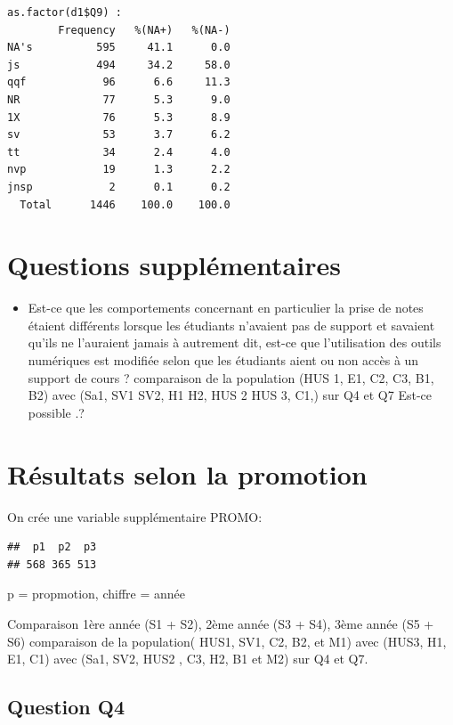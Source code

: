 \documentclass[]{article}
\begin{document}
\begin{verbatim}
as.factor(d1$Q9) : 
        Frequency   %(NA+)   %(NA-)
NA's          595     41.1      0.0
js            494     34.2     58.0
qqf            96      6.6     11.3
NR             77      5.3      9.0
1X             76      5.3      8.9
sv             53      3.7      6.2
tt             34      2.4      4.0
nvp            19      1.3      2.2
jnsp            2      0.1      0.2
  Total      1446    100.0    100.0
\end{verbatim}

\section{Questions supplémentaires}\label{questions-supplementaires}

\begin{itemize}
\itemsep1pt\parskip0pt
\item
  Est-ce que les comportements concernant en particulier la prise de
  notes étaient différents lorsque les étudiants n'avaient pas de
  support et savaient qu'ils ne l'auraient jamais à autrement dit,
  est-ce que l'utilisation des outils numériques est modifiée selon que
  les étudiants aient ou non accès à un support de cours ? comparaison
  de la population (HUS 1, E1, C2, C3, B1, B2) avec (Sa1, SV1 SV2, H1
  H2, HUS 2 HUS 3, C1,) sur Q4 et Q7 Est-ce possible .?
\end{itemize}

\section{Résultats selon la
promotion}\label{resultats-selon-la-promotion}

On crée une variable supplémentaire PROMO:

\begin{verbatim}
##  p1  p2  p3 
## 568 365 513
\end{verbatim}

p = propmotion, chiffre = année

Comparaison 1ère année (S1 + S2), 2ème année (S3 + S4), 3ème année (S5 +
S6) comparaison de la population( HUS1, SV1, C2, B2, et M1) avec (HUS3,
H1, E1, C1) avec (Sa1, SV2, HUS2 , C3, H2, B1 et M2) sur Q4 et Q7.

\subsection{Question Q4}\label{question-q4}
\end{document}
